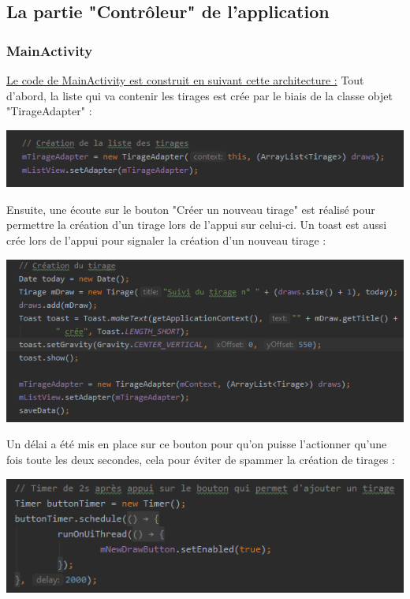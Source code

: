 \documentclass{article}
\begin{document}
\newpage
\subsection{La partie "Contrôleur" de l'application}
\subsubsection{MainActivity}
\vspace{1em}
\underline{Le code de MainActivity est construit en suivant cette architecture :}
\vspace{1em}
\newline Tout d'abord, la liste qui va contenir les tirages est crée par le biais de la classe objet "TirageAdapter" :
\newline
\begin{center} \includegraphics[]{creationList_mainActivity.png} \end{center}
\vspace{1em}
Ensuite, une écoute sur le bouton "Créer un nouveau tirage" est réalisé pour permettre la création d'un tirage lors de l'appui sur celui-ci. Un toast est aussi crée lors de l'appui pour signaler la création d'un nouveau tirage :
\newline
\begin{center} \includegraphics[]{creationTirage_mainActivity.png} \end{center}
\vspace{1em}
Un délai a été mis en place sur ce bouton pour qu'on puisse l'actionner qu'une fois toute les deux secondes, cela pour éviter de spammer la création de tirages :
\newline
\begin{center} \includegraphics[]{timer_MainActivity.png} \end{center}
\end{document}
